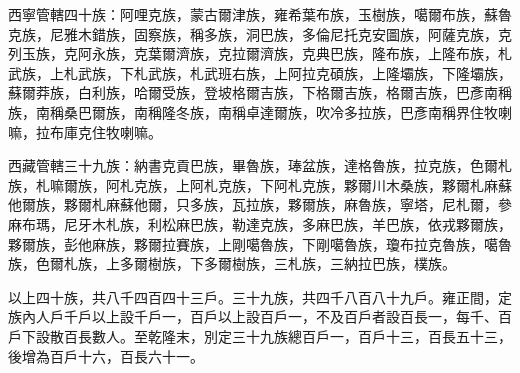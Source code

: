 \begin{pinyinscope}
西寧管轄四十族：阿哩克族，蒙古爾津族，雍希葉布族，玉樹族，噶爾布族，蘇魯克族，尼雅木錯族，固察族，稱多族，洞巴族，多倫尼托克安圖族，阿薩克族，克列玉族，克阿永族，克葉爾濟族，克拉爾濟族，克典巴族，隆布族，上隆布族，札武族，上札武族，下札武族，札武班右族，上阿拉克碩族，上隆壩族，下隆壩族，蘇爾莽族，白利族，哈爾受族，登坡格爾吉族，下格爾吉族，格爾吉族，巴彥南稱族，南稱桑巴爾族，南稱隆冬族，南稱卓達爾族，吹冷多拉族，巴彥南稱界住牧喇嘛，拉布庫克住牧喇嘛。

西藏管轄三十九族：納書克貢巴族，畢魯族，琫盆族，達格魯族，拉克族，色爾札族，札嘛爾族，阿札克族，上阿札克族，下阿札克族，夥爾川木桑族，夥爾札麻蘇他爾族，夥爾札麻蘇他爾，只多族，瓦拉族，夥爾族，麻魯族，寧塔，尼札爾，參麻布瑪，尼牙木札族，利松麻巴族，勒達克族，多麻巴族，羊巴族，依戎夥爾族，夥爾族，彭他麻族，夥爾拉賽族，上剛噶魯族，下剛噶魯族，瓊布拉克魯族，噶魯族，色爾札族，上多爾樹族，下多爾樹族，三札族，三納拉巴族，樸族。

以上四十族，共八千四百四十三戶。三十九族，共四千八百八十九戶。雍正間，定族內人戶千戶以上設千戶一，百戶以上設百戶一，不及百戶者設百長一，每千、百戶下設散百長數人。至乾隆末，別定三十九族總百戶一，百戶十三，百長五十三，後增為百戶十六，百長六十一。


\end{pinyinscope}